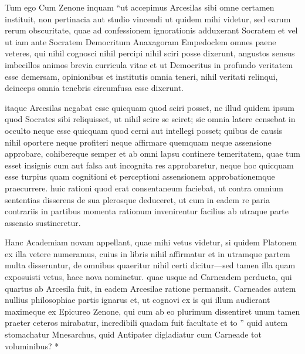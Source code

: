  Tum ego Cum Zenone inquam ``ut accepimus Arcesilas sibi omne certamen instituit, non pertinacia aut studio vincendi ut quidem mihi videtur, sed earum rerum obscuritate, quae ad confessionem ignorationis adduxerant Socratem et vel ut iam ante Socratem Democritum Anaxagoram Empedoclem omnes paene veteres, qui nihil cognosci nihil percipi nihil sciri posse dixerunt, angustos sensus imbecillos animos brevia curricula vitae et ut Democritus in profundo veritatem esse demersam, opinionibus et institutis omnia teneri, nihil veritati relinqui, deinceps omnia tenebris circumfusa esse dixerunt.

 itaque Arcesilas negabat esse quicquam quod sciri posset, ne illud quidem ipsum quod Socrates sibi reliquisset, ut nihil scire se sciret; sic omnia latere censebat in occulto neque esse quicquam quod cerni aut intellegi posset; quibus de causis nihil oportere neque profiteri neque affirmare quemquam neque assensione approbare, cohibereque semper et ab omni lapsu continere temeritatem, quae tum esset insignis cum aut falsa aut incognita res approbaretur, neque hoc quicquam esse turpius quam cognitioni et perceptioni assensionem approbationemque praecurrere. huic rationi quod erat consentaneum faciebat, ut contra omnium sententias disserens de sua plerosque deduceret, ut cum in eadem re paria contrariis in partibus momenta rationum invenirentur facilius ab utraque parte assensio sustineretur.

 Hanc Academiam novam appellant, quae mihi vetus videtur, si quidem Platonem ex illa vetere numeramus, cuius in libris nihil affirmatur et in utramque partem multa disseruntur, de omnibus quaeritur nihil certi dicitur—sed tamen illa quam exposuisti vetus, haec nova nominetur. quae usque ad Carneadem perducta, qui quartus ab Arcesila fuit, in eadem Arcesilae ratione permansit. Carneades autem nullius philosophiae partis ignarus et, ut cognovi ex is qui illum audierant maximeque ex Epicureo Zenone, qui cum ab eo plurimum dissentiret unum tamen praeter ceteros mirabatur, incredibili quadam fuit facultate et to '' quid autem stomachatur Mnesarchus, quid Antipater digladiatur cum Carneade tot voluminibus? *
